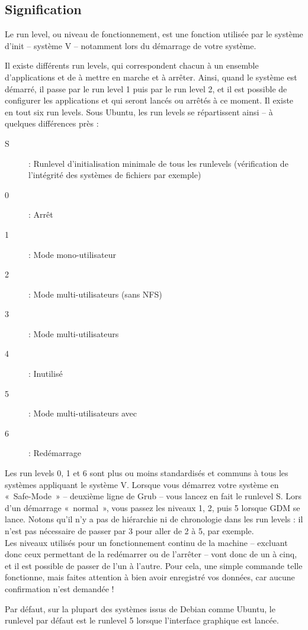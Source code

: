 \subsection{Signification}
Le run level, ou niveau de fonctionnement, est une fonction utilisée par le système d'init -- système V -- notamment lors du démarrage de votre système.\par
Il existe différents run levels, qui correspondent chacun à un ensemble d'applications et de  à mettre en marche et à arrêter. Ainsi, quand le système est démarré, il passe par le run level 1 puis par le run level 2, et il est possible de configurer les applications et  qui seront lancés ou arrêtés à ce moment. Il existe en tout six run levels. Sous Ubuntu, les run levels se répartissent ainsi -- à quelques différences près  :
\begin{description}
\item[S] : Runlevel d'initialisation minimale de tous les runlevels (vérification de l'intégrité des systèmes de fichiers par exemple) 
\item[0] : Arrêt 
\item[1] : Mode mono-utilisateur 
\item[2] : Mode multi-utilisateurs (sans NFS) 
\item[3] : Mode multi-utilisateurs 
\item[4] : Inutilisé 
\item[5] : Mode multi-utilisateurs avec 
\item[6] : Redémarrage 
\end{description}
Les run levels 0, 1 et 6 sont plus ou moins standardisés et communs à tous les systèmes appliquant le système V. Lorsque vous démarrez votre système en «~Safe-Mode~» -- deuxième ligne de Grub -- vous lancez en fait le runlevel S. Lors d'un démarrage «~normal~», vous passez les niveaux 1, 2, puis 5 lorsque GDM se lance. Notons qu'il n'y a pas de hiérarchie ni de chronologie dans les run levels : il n'est pas nécessaire de passer par 3 pour aller de 2 à 5, par exemple.\\
Les niveaux utilisés pour un fonctionnement continu de la machine -- excluant donc ceux permettant de la redémarrer ou de l'arrêter -- vont donc de un à cinq, et il est possible de passer de l'un à l'autre. Pour cela, une simple commande telle  fonctionne, mais faites attention à bien avoir enregistré vos données, car aucune confirmation n'est demandée !\par
Par défaut, sur la plupart des systèmes issus de Debian comme Ubuntu, le runlevel par défaut est le runlevel 5 lorsque l'interface graphique est lancée.
